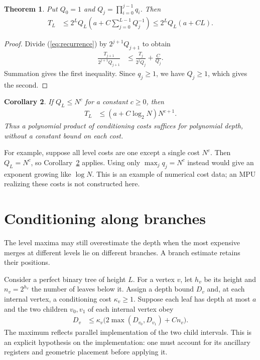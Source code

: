 \documentclass[11pt]{article}
\newtheorem{theorem}{Theorem}
\newtheorem{corollary}[theorem]{Corollary}
\begin{document}
\begin{theorem}\label{thm:levels}
Put $Q_0=1$ and $Q_j=\prod_{i=0}^{j-1}q_i$. Then
\begin{align}
 T_L
 &\leq 2^LQ_L\left(a+C\sum_{j=0}^{L-1}Q_j^{-1}\right)
 \leq 2^LQ_L(a+CL).
 \label{eq:level-bound}
\end{align}
\end{theorem}

\begin{proof}
Divide (\ref{eq:recurrence}) by $2^{j+1}Q_{j+1}$ to obtain
\begin{align}
 \frac{T_{j+1}}{2^{j+1}Q_{j+1}}
 &\leq \frac{T_j}{2^jQ_j}+\frac{C}{Q_j}.
\end{align}
Summation gives the first inequality. Since $q_j\geq1$, we have
$Q_j\geq1$, which gives the second.
\end{proof}

\begin{corollary}\label{cor:polynomial}
If $Q_L\leq N^c$ for a constant $c\geq0$, then
\begin{align}
 T_L&\leq (a+C\log_2N)N^{c+1}.
\end{align}
Thus a polynomial product of conditioning costs suffices for polynomial
depth, without a constant bound on each cost.
\end{corollary}

For example, suppose all level costs are one except a single cost $N^c$.
Then $Q_L=N^c$, so Corollary~\ref{cor:polynomial} applies. Using only
$\max_jq_j=N^c$ instead would give an exponent growing like $\log N$.
This is an example of numerical cost data; an MPU realizing these costs is
not constructed here.

\section{Conditioning along branches}

The level maxima may still overestimate the depth when the most expensive
merges at different levels lie on different branches. A branch estimate
retains their positions.

Consider a perfect binary tree of height $L$. For a vertex $v$, let $h_v$
be its height and $n_v=2^{h_v}$ the number of leaves below it. Assign a
depth bound $D_v$ and, at each internal vertex, a conditioning cost
$\kappa_v\geq1$. Suppose each leaf has depth at most $a$ and the two
children $v_0,v_1$ of each internal vertex obey
\begin{align}
 D_v&\leq\kappa_v
       \bigl(2\max(D_{v_0},D_{v_1})+Cn_v\bigr).
 \label{eq:branch-recurrence}
\end{align}
The maximum reflects parallel implementation of the two child intervals.
This is an explicit hypothesis on the implementation: one must account
for its ancillary registers and geometric placement before applying it.
\end{document}
